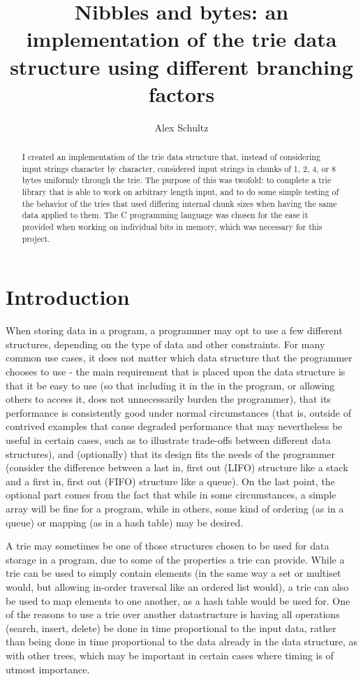 \documentclass{llncs}
\title{Nibbles and bytes: an implementation of the trie data structure using different branching factors}
\author{Alex Schultz}
\institute{Tufts University}
\begin{document}
\maketitle

\begin{abstract}
I created an implementation of the trie data structure that, instead of considering input strings character by character, considered input strings in chunks of 1, 2, 4, or 8 bytes uniformly through the trie. The purpose of this was twofold: to complete a trie library that is able to work on arbitrary length input, and to do some simple testing of the behavior of the tries that used differing internal chunk sizes when having the same data applied to them. The C programming language was chosen for the ease it provided when working on individual bits in memory, which was necessary for this project.
\end{abstract}

\section{Introduction}
\label{Introduction}
When storing data in a program, a programmer may opt to use a few different structures, depending on the type of data and other constraints. For many common use cases, it does not matter which data structure that the programmer chooses to use - the main requirement that is placed upon the data structure is that it be easy to use (so that including it in the in the program, or allowing others to access it, does not unnecessarily burden the programmer), that its performance is consistently good under normal circumstances (that is, outside of contrived examples that cause degraded performance that may nevertheless be useful in certain cases, such as to illustrate trade-offs between different data structures), and (optionally) that its design fits the needs of the programmer (consider the difference between a last in, first out (LIFO) structure like a stack and a first in, first out (FIFO) structure like a queue). On the last point, the optional part comes from the fact that while in some circumstances, a simple array will be fine for a program, while in others, some kind of ordering (as in a queue) or mapping (as in a hash table) may be desired.

A trie may sometimes be one of those structures chosen to be used for data storage in a program, due to some of the properties a trie can provide. While a trie can be used to simply contain elements (in the same way a set or multiset would, but allowing in-order traversal like an ordered list would), a trie can also be used to map elements to one another, as a hash table would be used for. One of the reasons to use a trie over another datastructure is having all operations (search, insert, delete) be done in time proportional to the input data, rather than being done in time proportional to the data already in the data structure, as with other trees, which may be important in certain cases where timing is of utmost importance.
\end{document}
